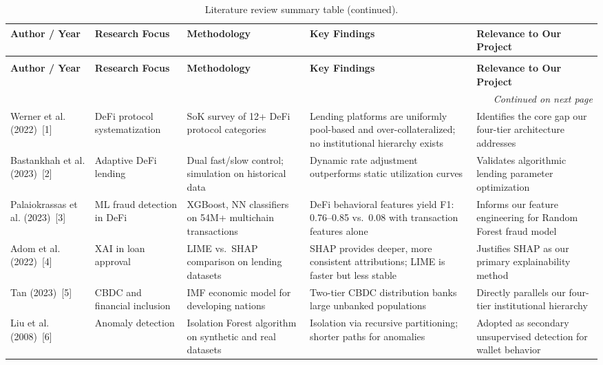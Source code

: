 \documentclass[12pt,a4paper]{report}
\newcommand{\tableheadfont}{\bfseries\small\color{PrimaryBlue}}
\begin{document}
\begin{longtable}{@{} p{2.2cm} p{2.2cm} p{2.5cm} p{2.8cm} p{2.8cm} @{}}
\caption{Literature review summary table.}\label{tab:lit-summary}\\
\toprule
\tableheadfont Author / Year & \tableheadfont Research Focus & \tableheadfont Methodology & \tableheadfont Key Findings & \tableheadfont Relevance to Our Project \\
\midrule
\endfirsthead
\caption[]{Literature review summary table (continued).}\\
\toprule
\tableheadfont Author / Year & \tableheadfont Research Focus & \tableheadfont Methodology & \tableheadfont Key Findings & \tableheadfont Relevance to Our Project \\
\midrule
\endhead
\midrule
\multicolumn{5}{r}{\small\itshape Continued on next page}\\
\endfoot
\bottomrule
\endlastfoot
\rowcolor{RowShade}
Werner et al. (2022)~[1] & DeFi protocol systematization & SoK survey of 12+ DeFi protocol categories & Lending platforms are uniformly pool-based and over-collateralized; no institutional hierarchy exists & Identifies the core gap our four-tier architecture addresses \\
Bastankhah et al. (2023)~[2] & Adaptive DeFi lending & Dual fast/slow control; simulation on historical data & Dynamic rate adjustment outperforms static utilization curves & Validates algorithmic lending parameter optimization \\
\rowcolor{RowShade}
Palaiokrassas et al. (2023)~[3] & ML fraud detection in DeFi & XGBoost, NN classifiers on 54M+ multichain transactions & DeFi behavioral features yield F1: 0.76--0.85 vs.\ 0.08 with transaction features alone & Informs our feature engineering for Random Forest fraud model \\
Adom et al. (2022)~[4] & XAI in loan approval & LIME vs.\ SHAP comparison on lending datasets & SHAP provides deeper, more consistent attributions; LIME is faster but less stable & Justifies SHAP as our primary explainability method \\
\rowcolor{RowShade}
Tan (2023)~[5] & CBDC and financial inclusion & IMF economic model for developing nations & Two-tier CBDC distribution banks large unbanked populations & Directly parallels our four-tier institutional hierarchy \\
Liu et al. (2008)~[6] & Anomaly detection & Isolation Forest algorithm on synthetic and real datasets & Isolation via recursive partitioning; shorter paths for anomalies & Adopted as secondary unsupervised detection for wallet behavior \\

\end{longtable}
\end{document}
